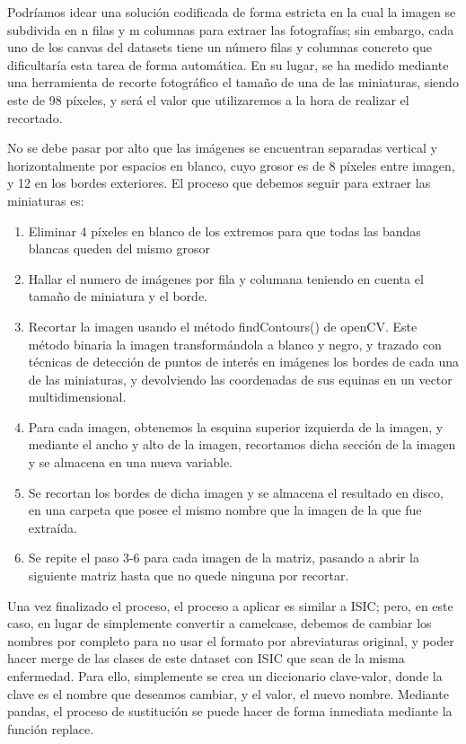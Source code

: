 Podríamos idear una solución codificada de forma estricta en la cual la imagen se subdivida en n filas y m columnas para extraer las fotografías; sin embargo, cada uno de los canvas del datasets tiene un número filas y columnas concreto que dificultaría esta tarea de forma automática. En su lugar, se ha medido mediante una herramienta de recorte fotográfico el tamaño de una de las miniaturas, siendo este de 98 píxeles, y será el valor que utilizaremos a la hora de realizar el recortado.

No se debe pasar por alto que las imágenes se encuentran separadas vertical y horizontalmente por espacios en blanco, cuyo grosor es de 8 píxeles entre imagen, y 12 en los bordes exteriores. El proceso que debemos seguir para extraer las miniaturas es:

\begin{enumerate}
	\item Eliminar 4 píxeles en blanco de los extremos para que todas las bandas blancas queden del mismo grosor
	\item Hallar el numero de imágenes por fila y columana teniendo en cuenta el tamaño de miniatura y el borde.
	\item Recortar la imagen usando el método findContours() de openCV. Este método binaria la imagen transformándola a blanco y negro, y trazado con técnicas de detección de puntos de interés en imágenes los bordes de cada una de las miniaturas, y devolviendo las coordenadas de sus equinas en un vector multidimensional. 
	\item Para cada imagen, obtenemos la esquina superior izquierda de la imagen, y mediante el ancho y alto de la imagen, recortamos dicha sección de la imagen y se almacena en una nueva variable.
	\item Se recortan los bordes de dicha imagen y se almacena el resultado en disco, en una carpeta que posee el mismo nombre que la imagen de la que fue extraída.
	\item Se repite el paso 3-6 para cada imagen de la matriz, pasando a abrir la siguiente matriz hasta que no quede ninguna por recortar.
\end{enumerate}

Una vez finalizado el proceso, el proceso a aplicar es similar a ISIC; pero, en este caso, en lugar de simplemente convertir a camelcase, debemos de cambiar los nombres por completo para no usar el formato por abreviaturas original, y poder hacer merge de las clases de este dataset con ISIC que sean de la misma enfermedad. Para ello, simplemente se crea un diccionario clave-valor, donde la clave es el nombre que deseamos cambiar, y el valor, el nuevo nombre. Mediante pandas, el proceso de sustitución se puede hacer de forma inmediata mediante la función replace.

